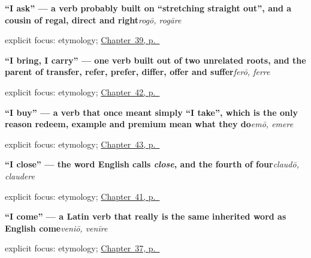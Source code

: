 \noindent\begin{minipage}[t]{\linewidth}
\raggedright
\textbf{\textquotedblleft{}I ask\textquotedblright{} — a verb probably built on \textquotedblleft{}stretching straight out\textquotedblright{}, and a cousin of regal, direct and right}\enspace\emph{rogō, rogāre}\par
\footnotesize explicit focus: etymology; \hyperref[ch:la-doing-verbs]{Chapter~39, p.~\pageref*{ch:la-doing-verbs}}
\end{minipage}\par\smallskip

\noindent\begin{minipage}[t]{\linewidth}
\raggedright
\textbf{\textquotedblleft{}I bring, I carry\textquotedblright{} — one verb built out of two unrelated roots, and the parent of transfer, refer, prefer, differ, offer and suffer}\enspace\emph{ferō, ferre}\par
\footnotesize explicit focus: etymology; \hyperref[ch:la-getting-and-waiting-verbs]{Chapter~42, p.~\pageref*{ch:la-getting-and-waiting-verbs}}
\end{minipage}\par\smallskip

\noindent\begin{minipage}[t]{\linewidth}
\raggedright
\textbf{\textquotedblleft{}I buy\textquotedblright{} — a verb that once meant simply \textquotedblleft{}I take\textquotedblright{}, which is the only reason redeem, example and premium mean what they do}\enspace\emph{emō, emere}\par
\footnotesize explicit focus: etymology; \hyperref[ch:la-answering-meeting-buying]{Chapter~43, p.~\pageref*{ch:la-answering-meeting-buying}}
\end{minipage}\par\smallskip

\noindent\begin{minipage}[t]{\linewidth}
\raggedright
\textbf{\textquotedblleft{}I close\textquotedblright{} — the word English calls \emph{close}, and the fourth of four}\enspace\emph{claudō, claudere}\par
\footnotesize explicit focus: etymology; \hyperref[ch:la-motion-verbs]{Chapter~41, p.~\pageref*{ch:la-motion-verbs}}
\end{minipage}\par\smallskip

\noindent\begin{minipage}[t]{\linewidth}
\raggedright
\textbf{\textquotedblleft{}I come\textquotedblright{} — a Latin verb that really is the same inherited word as English come}\enspace\emph{veniō, venīre}\par
\footnotesize explicit focus: etymology; \hyperref[ch:la-core-verbs]{Chapter~37, p.~\pageref*{ch:la-core-verbs}}
\end{minipage}\par\smallskip

